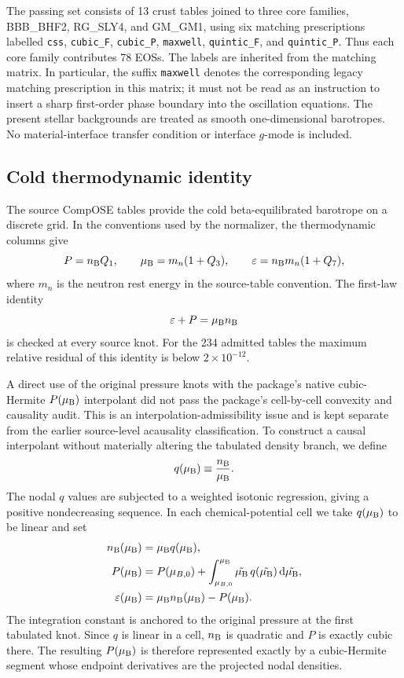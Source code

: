 \documentclass[aps,prd,twocolumn,superscriptaddress,nofootinbib]{revtex4-2}
\newcommand{\eps}{\varepsilon}
\newcommand{\mub}{\mu_{\rm B}}
\newcommand{\nb}{n_{\rm B}}
\newcommand{\dd}{\mathrm{d}}
\begin{document}
The passing set consists of 13 crust tables joined to three core families, BBB\_BHF2, RG\_SLY4, and GM\_GM1, using six matching prescriptions labelled \texttt{css}, \texttt{cubic\_F}, \texttt{cubic\_P}, \texttt{maxwell}, \texttt{quintic\_F}, and \texttt{quintic\_P}. Thus each core family contributes 78 EOSs. The labels are inherited from the matching matrix. In particular, the suffix \texttt{maxwell} denotes the corresponding legacy matching prescription in this matrix; it must not be read as an instruction to insert a sharp first-order phase boundary into the oscillation equations. The present stellar backgrounds are treated as smooth one-dimensional barotropes. No material-interface transfer condition or interface $g$-mode is included.

\subsection{Cold thermodynamic identity}

The source CompOSE tables provide the cold beta-equilibrated barotrope on a discrete grid. In the conventions used by the normalizer, the thermodynamic columns give
\begin{equation}
P=\nb Q_1,\qquad
\mub=m_n(1+Q_3),\qquad
\eps=\nb m_n(1+Q_7),
\label{eq:compose}
\end{equation}
where $m_n$ is the neutron rest energy in the source-table convention. The first-law identity
\begin{equation}
\eps+P=\mub\nb
\label{eq:firstlaw}
\end{equation}
is checked at every source knot. For the 234 admitted tables the maximum relative residual of this identity is below $2\times10^{-12}$.

A direct use of the original pressure knots with the package's native cubic-Hermite $P(\mub)$ interpolant did not pass the package's cell-by-cell convexity and causality audit. This is an interpolation-admissibility issue and is kept separate from the earlier source-level acausality classification. To construct a causal interpolant without materially altering the tabulated density branch, we define
\begin{equation}
q(\mub)\equiv\frac{\nb}{\mub}.
\end{equation}
The nodal $q$ values are subjected to a weighted isotonic regression, giving a positive nondecreasing sequence. In each chemical-potential cell we take $q(\mub)$ to be linear and set
\begin{align}
\nb(\mub)&=\mub q(\mub),\\
P(\mub)&=P(\mu_{B,0})+\int_{\mu_{B,0}}^{\mub}
                 \tilde{\mub}\,q(\tilde{\mub})\,\dd\tilde{\mub},\\
\eps(\mub)&=\mub\nb(\mub)-P(\mub).
\label{eq:projection}
\end{align}
The integration constant is anchored to the original pressure at the first tabulated knot. Since $q$ is linear in a cell, $\nb$ is quadratic and $P$ is exactly cubic there. The resulting $P(\mub)$ is therefore represented exactly by a cubic-Hermite segment whose endpoint derivatives are the projected nodal densities.
\end{document}

